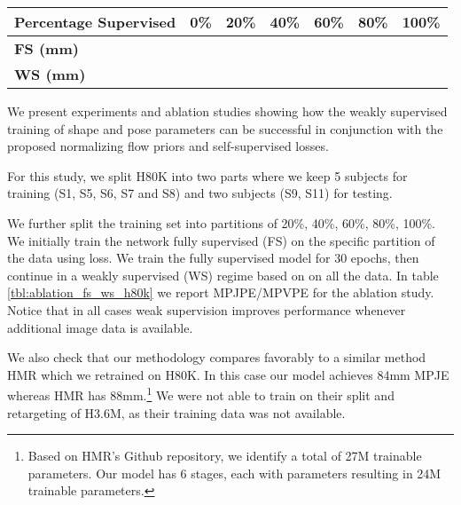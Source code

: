 \documentclass[runningheads]{llncs}
\begin{document}
\begin{table*}[!htbp]
    \small
    \centering
    \begin{tabular}[t]{|l|r|r|r|r|r|r|}
    \hline
    \textbf{Percentage Supervised}  & {0\%} & {20\%} & {40\%} & {60\%} & {80\%} & {100\%}  \\ 
    \hline
    \hline
    \textbf{FS (mm)} &  &  &  &  &  & \\
    \hline
    \textbf{WS (mm)} &  &  &  &  &  &  \\
    \hline
    \end{tabular}
    \caption{\small Ablations on H80K, reported as MPJPE/MPVPE metrics in millimeters. Notice the impact of weakly supervised losses (WS), especially in the fully supervised (FS) regime with small training sets, as well as for the model initialized randomly (column two,  supervision). }
\label{tbl:ablation_fs_ws_h80k}
\end{table*}

We present experiments and ablation studies showing how the weakly supervised training of shape and pose parameters  can be successful in conjunction with the proposed normalizing flow priors and self-supervised losses.

For this study, we split H80K into two parts where we keep 5 subjects for training (S1, S5, S6, S7 and S8) and two subjects (S9, S11) for testing.

We further split the training set into partitions of 20\%, 40\%, 60\%, 80\%, 100\%. We initially train the network fully supervised (FS) on the specific partition of the data using  loss. We train the fully supervised model for 30 epochs, then continue in a weakly supervised (WS) regime based on  on all the data. 
In table \ref{tbl:ablation_fs_ws_h80k} we report MPJPE/MPVPE for the ablation study. Notice  that in all cases weak supervision improves performance whenever additional image data is available.

We also check that our methodology compares favorably to a similar method HMR \cite{Kanazawa2018} which we retrained on H80K. In this case our model achieves 84mm MPJE whereas HMR has 88mm.\footnote{Based on HMR's Github repository, we identify a total of 27M trainable parameters. 
Our model has 6 stages, each with  parameters resulting in 24M trainable parameters. } We were not able to train on their split and retargeting of H3.6M, as their training data was not available.
\end{document}

